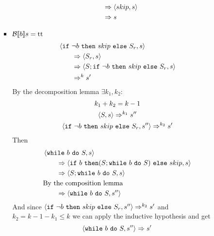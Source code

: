 \begin{exercise}
\begin{itemize}
\begin{itemize}
\begin{itemize}
\begin{gather*}
\begin{align*}
                            \\&\qquad\Rightarrow \left<skip, s\right>
                            \\&\qquad\Rightarrow s
                        \end{align*}
                    \end{gather*}
                    \item $\mathcal{B} \llbracket  b \rrbracket s = \text{tt}$
                    \begin{align*}
                        &\instr{\texttt{if}\ \neg b\ \texttt{then}\ skip\ \texttt{else}\ S_r}{s}
                        \\&\qquad\Rightarrow \instr{S_r}{s}
                        \\&\qquad\Rightarrow \instr{S; \texttt{if}\ \neg b\ \texttt{then}\ skip\ \texttt{else}\ S_r}{s}
                        \\&\qquad\Rightarrow^k s'
                    \end{align*}
                    By the decomposition lemma $\exists k_1, k_2 :$
                    \begin{gather*}
                        k_1 + k_2 = k - 1 \\
                        \instr{S}{s} \Rightarrow^{k_1} s'' \\
                        \instr{\texttt{if}\ \neg b\ \texttt{then}\ skip\ \texttt{else}\ S_r}{s''} \Rightarrow^{k_2} s'
                    \end{gather*}
                    Then
                    \begin{align*}
                        &\instr{\texttt{while}\ b\ \texttt{do}\ S}{s}
                        \\&\qquad\Rightarrow \instr{\texttt{if}\ b\ \texttt{then} (S; \texttt{while}\ b\ \texttt{do}\ S)\ \texttt{else}\ skip}{s}
                        \\&\qquad\Rightarrow \instr{S; \texttt{while}\ b\ \texttt{do}\ S}{s}
                        \\&\text{By the composition lemma}
                        \\&\qquad\Rightarrow \instr{\texttt{while}\ b\ \texttt{do}\ S}{s''}
                    \end{align*}
                    And since $\instr{\texttt{if}\ \neg b\ \texttt{then}\ skip\ \texttt{else}\ S_r}{s''} \Rightarrow^{k_2} s'$ and $k_2 = k - 1 - k_1 \leq k$  we can apply the inductive hypothesis and get
                    \[ \left<\texttt{while}\ b\ \texttt{do}\ S, s''\right> \Rightarrow s' \]

\end{itemize}
\end{itemize}
\end{itemize}
\end{exercise}
